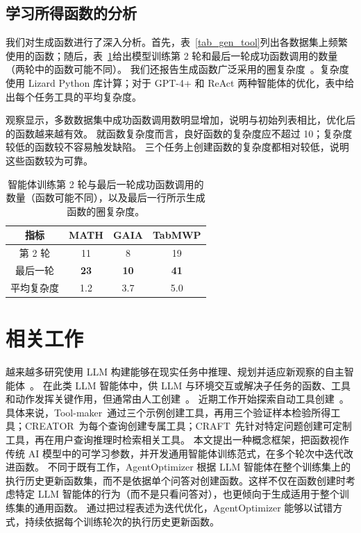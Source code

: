 \documentclass{article}
\begin{document}
\subsection{学习所得函数的分析}

我们对生成函数进行了深入分析。首先，表~\ref{tab_gen_tool}列出各数据集上频繁使用的函数；随后，表~\ref{tab_tool_analysis}给出模型训练第 2 轮和最后一轮成功函数调用的数量（两轮中的函数可能不同）。
我们还报告生成函数广泛采用的圈复杂度~\cite{mccabe1994software}。复杂度使用 Lizard Python 库计算；对于 GPT-4+ 和 ReAct 两种智能体的优化，表中给出每个任务工具的平均复杂度。

观察显示，多数数据集中成功函数调用数明显增加，说明与初始列表相比，优化后的函数越来越有效。
就函数复杂度而言，良好函数的复杂度应不超过 10；复杂度较低的函数较不容易触发缺陷。
三个任务上创建函数的复杂度都相对较低，说明这些函数较为可靠。

\begin{table}[!t]
\centering
\setlength{\tabcolsep}{7pt}
\renewcommand{\arraystretch}{0.9}
\begin{tabular}{cccc}
\toprule[1.5pt]
指标 & MATH & GAIA & TabMWP \\ \hline
第 2 轮 & 11 & 8 & 19 \\
最后一轮 & \textbf{23} & \textbf{10} & \textbf{41} \\
平均复杂度 & 1.2 & 3.7 & 5.0 \\ \bottomrule[1.5pt]
\end{tabular}
\caption{智能体训练第 2 轮与最后一轮成功函数调用的数量（函数可能不同），以及最后一行所示生成函数的圈复杂度。}
\label{tab_tool_analysis}
\end{table}

\section{相关工作}

越来越多研究使用 LLM 构建能够在现实任务中推理、规划并适应新观察的自主智能体~\cite{xi2023rise,wang2023survey,hong2023metagpt,yao2022react,wu2023autogen,li2023camel,babyagi,park2023generative}。
在此类 LLM 智能体中，供 LLM 与环境交互或解决子任务的函数、工具和动作发挥关键作用，但通常由人工创建~\cite{yao2022react}。
近期工作开始探索自动工具创建~\cite{cai2023large,qian2023creator,yuan2023craft}。
具体来说，Tool-maker~\cite{cai2023large}通过三个示例创建工具，再用三个验证样本检验所得工具；CREATOR~\cite{qian2023creator}为每个查询创建专属工具；CRAFT~\cite{yuan2023craft}先针对特定问题创建可定制工具，再在用户查询推理时检索相关工具。
本文提出一种概念框架，把函数视作传统 AI 模型中的可学习参数，并开发通用智能体训练范式，在多个轮次中迭代改进函数。
不同于既有工作，AgentOptimizer 根据 LLM 智能体在整个训练集上的执行历史更新函数集，而不是依据单个问答对创建函数。这样不仅在函数创建时考虑特定 LLM 智能体的行为（而不是只看问答对），也更倾向于生成适用于整个训练集的通用函数。
通过把过程表述为迭代优化，AgentOptimizer 能够以试错方式，持续依据每个训练轮次的执行历史更新函数。
\end{document}
